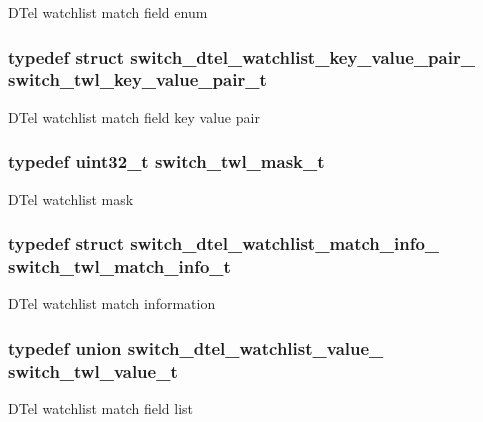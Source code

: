 D\+Tel watchlist match field enum \hypertarget{group__DTel_ga32b4f5a66b9bce81be295a7388eadb04}{
\subsubsection[{switch\+\_\+twl\+\_\+key\+\_\+value\+\_\+pair\+\_\+t}]{\setlength{\rightskip}{0pt plus 5cm}typedef struct {\bf switch\+\_\+dtel\+\_\+watchlist\+\_\+key\+\_\+value\+\_\+pair\+\_\+}  {\bf switch\+\_\+twl\+\_\+key\+\_\+value\+\_\+pair\+\_\+t}}}\label{group__DTel_ga32b4f5a66b9bce81be295a7388eadb04}
D\+Tel watchlist match field key value pair \hypertarget{group__DTel_ga2d24f83795fcb9f29c85153777c47d8f}{
\subsubsection[{switch\+\_\+twl\+\_\+mask\+\_\+t}]{\setlength{\rightskip}{0pt plus 5cm}typedef uint32\+\_\+t {\bf switch\+\_\+twl\+\_\+mask\+\_\+t}}}\label{group__DTel_ga2d24f83795fcb9f29c85153777c47d8f}
D\+Tel watchlist mask \hypertarget{group__DTel_gaf669663e566583a08f1b606876efa9e6}{
\subsubsection[{switch\+\_\+twl\+\_\+match\+\_\+info\+\_\+t}]{\setlength{\rightskip}{0pt plus 5cm}typedef struct {\bf switch\+\_\+dtel\+\_\+watchlist\+\_\+match\+\_\+info\+\_\+}  {\bf switch\+\_\+twl\+\_\+match\+\_\+info\+\_\+t}}}\label{group__DTel_gaf669663e566583a08f1b606876efa9e6}
D\+Tel watchlist match information \hypertarget{group__DTel_ga7a0ef1d328d3dff99e1d4ad961691b78}{
\subsubsection[{switch\+\_\+twl\+\_\+value\+\_\+t}]{\setlength{\rightskip}{0pt plus 5cm}typedef union {\bf switch\+\_\+dtel\+\_\+watchlist\+\_\+value\+\_\+}  {\bf switch\+\_\+twl\+\_\+value\+\_\+t}}}\label{group__DTel_ga7a0ef1d328d3dff99e1d4ad961691b78}
D\+Tel watchlist match field list 

